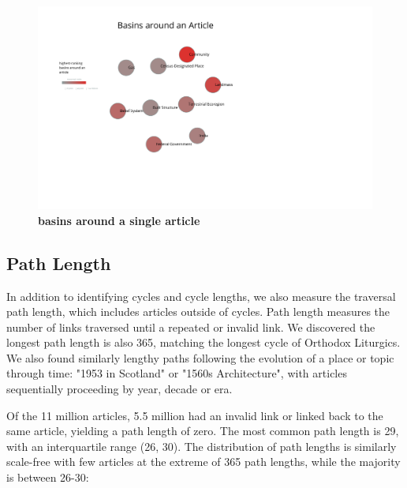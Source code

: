 \documentclass[pre,twocolumn,twoside,superscriptaddress,floatfix, aps, 10pt]{revtex4-1}
\begin{document}
\begin{figure}[tp!]
  \centering	
  \includegraphics[width=\columnwidth]{graphics/basins.pdf}
  \caption{
    \textbf{basins around a single article}
  }
  \label{fig:basins}

\end{figure}

\subsection{Path Length}

In addition to identifying cycles and cycle lengths, we also measure the traversal path length, which includes articles outside
of cycles. 
Path length measures the number of links traversed until a repeated or invalid link. 
We discovered the longest path length is also 365, matching the longest cycle of Orthodox Liturgics. 
We also found similarly lengthy paths following the evolution of a place or topic through time: 
"1953 in Scotland" or "1560s Architecture", with articles sequentially proceeding by year, decade or era.

Of the 11 million articles, 5.5 million had an invalid link or linked back to the same article, yielding a path length of zero. 
The most common path length is 29, with an interquartile range (26, 30).
The distribution of path lengths is similarly scale-free with few articles at the extreme of 365 path lengths, while the majority 
is between 26-30: 
\end{document}
